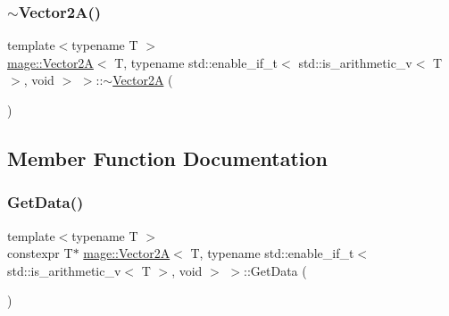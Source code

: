\subsubsection{\texorpdfstring{$\sim$\+Vector2\+A()}{~Vector2A()}}
{\footnotesize\ttfamily template$<$typename T $>$ \\
\hyperlink{structmage_1_1_vector2_a}{mage\+::\+Vector2A}$<$ T, typename std\+::enable\+\_\+if\+\_\+t$<$ std\+::is\+\_\+arithmetic\+\_\+v$<$ T $>$, void $>$ $>$\+::$\sim$\hyperlink{structmage_1_1_vector2_a}{Vector2A} (\begin{DoxyParamCaption}{ }\end{DoxyParamCaption})\hspace{0.3cm}{\ttfamily [default]}}



\subsection{Member Function Documentation}
\hypertarget{structmage_1_1_vector2_a_3_01_t_00_01typename_01std_1_1enable__if__t_3_01std_1_1is__arithmetic__b421e7a25afc1ac5972d3b452777021a_a3585c99e49867ec4e893697b147937cd}{}\label{structmage_1_1_vector2_a_3_01_t_00_01typename_01std_1_1enable__if__t_3_01std_1_1is__arithmetic__b421e7a25afc1ac5972d3b452777021a_a3585c99e49867ec4e893697b147937cd} 
\subsubsection{\texorpdfstring{Get\+Data()}{GetData()}\hspace{0.1cm}{\footnotesize\ttfamily [1/2]}}
{\footnotesize\ttfamily template$<$typename T $>$ \\
constexpr T$\ast$ \hyperlink{structmage_1_1_vector2_a}{mage\+::\+Vector2A}$<$ T, typename std\+::enable\+\_\+if\+\_\+t$<$ std\+::is\+\_\+arithmetic\+\_\+v$<$ T $>$, void $>$ $>$\+::Get\+Data (\begin{DoxyParamCaption}{ }\end{DoxyParamCaption})\hspace{0.3cm}{\ttfamily [noexcept]}}

